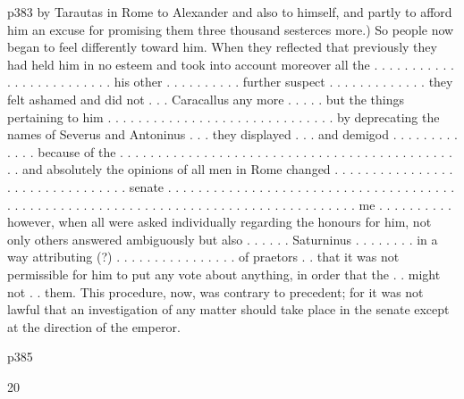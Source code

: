 p383 by Tarautas in Rome to Alexander and also to himself, and partly to afford him an excuse for promising them three thousand sesterces more.) So people now began to feel differently toward him. When they reflected that previously they had held him in no esteem and took into account moreover all the . . . . . . . . . . . . . . . . . . . . . . . . . his other . . . . . . . . . . further suspect . . . . . . . . . . . . . they felt ashamed and did not . . . Caracallus any more . . . . . but the things pertaining to him . . . . . . . . . . . . . . . . . . . . . . . . . . . . . . by deprecating the names of Severus and Antoninus . . . they displayed . . . and demigod . . . . . . . . . . . . . because of the . . . . . . . . . . . . . . . . . . . . . . . . . . . . . . . . . . . . . . . . . . . . . . and absolutely the opinions of all men in Rome changed . . . . . . . . . . . . . . . . . . . . . . . . . . . . . . . . senate . . . . . . . . . . . . . . . . . . . . . . . . . . . . . . . . . . . . . . . . . . . . . . . . . . . . . . . . . . . . . . . . . . . . . . . . . . . . . . . . . . . . me . . . . . . . . . . however, when all were asked individually regarding the honours for him, not only others answered ambiguously but also . . . . . . Saturninus . . . . . . . . in a way attributing (?) . . . . . . . . . . . . . . . . of praetors . . that it was not permissible for him to put any vote about anything, in order that the . . might not . . them. This procedure, now, was contrary to precedent; for it was not lawful that an investigation of any matter should take place in the senate except at the direction of the emperor.

p385

20


